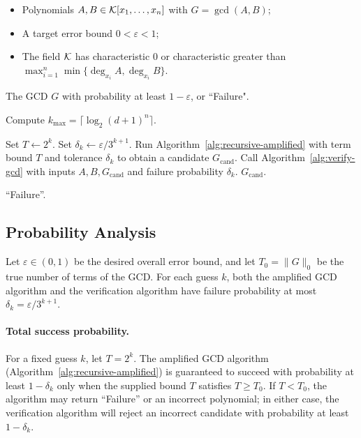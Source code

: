 \documentclass{article}
\numberwithin{equation}{section}
\begin{document}
\begin{algorithm}[H]
\caption{GCD Computation without Term Bound}
\label{alg:gcd-guess}
\begin{algorithmic}[1]
\Require
    \begin{itemize}
        \item Polynomials $A, B \in {\mathcal{K}}[x_1,\dots,x_n]$ with $G = \gcd(A,B)$;
        \item A target error bound $0<\varepsilon<1$;
        \item The field ${\mathcal{K}}$ has characteristic $0$ or characteristic greater than $\max_{i=1}^n\min\{\deg_{x_i} A,\deg_{x_i} B\}$.
    \end{itemize}
\Ensure
    The GCD $G$ with probability at least $1-\varepsilon$, or ``Failure".

\State Compute $k_{\max} = \lceil \log_2 (d+1)^n \rceil$.

    \State Set $T \gets 2^k$.
    \State Set $\delta_k \gets \varepsilon / 3^{k+1}$.
    \State Run Algorithm~\ref{alg:recursive-amplified} with term bound $T$ and tolerance $\delta_k$ to obtain a candidate $G_{\text{cand}}$.
        \State Call Algorithm~\ref{alg:verify-gcd} with inputs $A, B, G_{\text{cand}}$ and failure probability $\delta_k$.
            \State \Return $G_{\text{cand}}$.
        \EndIf
    \EndIf
\EndFor

\State \Return ``Failure''.
\end{algorithmic}
\end{algorithm}

\subsection*{Probability Analysis}

Let $\varepsilon \in (0,1)$ be the desired overall error bound, and let $T_0 = \|G\|_0$ be the true number of terms of the GCD. For each guess $k$, both the amplified GCD algorithm and the verification algorithm have failure probability at most $\delta_k = \varepsilon / 3^{k+1}$.

\paragraph{Total success probability.}
For a fixed guess $k$, let $T = 2^k$. The amplified GCD algorithm (Algorithm~\ref{alg:recursive-amplified}) is guaranteed to succeed with probability at least $1-\delta_k$ only when the supplied bound $T$ satisfies $T \ge T_0$. If $T < T_0$, the algorithm may return ``Failure'' or an incorrect polynomial; in either case, the verification algorithm will reject an incorrect candidate with probability at least $1-\delta_k$.
\end{document}
